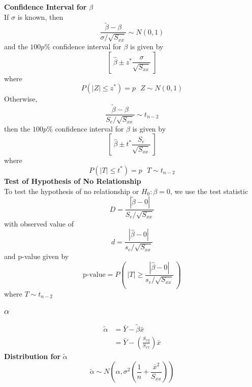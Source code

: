 \documentclass[12pt, leqno]{article}
\theoremstyle{definition}
\begin{document}
  \textbf{Confidence Interval for} $\beta$ \\
  If $\sigma$ is known, then
  $$\frac{\widetilde{\beta} - \beta}{\sigma / \sqrt{S_{xx}}} \sim N(0, 1)$$
  and the $100p\%$ confidence interval for $\beta$ is given by
  $$\left[~ \hat{\beta} \pm z^{*}\frac{\sigma}{\sqrt{S_{xx}}} ~\right]$$
  where
  $$P(|Z| \leq z^{*}) = p ~~~ Z \sim N(0, 1)$$
  \newline
  Otherwise,
  $$\frac{\widetilde{\beta} - \beta}{S_{e} / \sqrt{S_{xx}}} \sim t_{n-2}$$
  then the $100p\%$ confidence interval for $\beta$ is given by
  $$\left[~ \hat{\beta} \pm t^{*}\frac{S_{e}}{\sqrt{S_{xx}}} ~\right]$$
  where
  $$P(|T| \leq t^{*}) = p ~~~ T \sim t_{n-2}$$
  \newline
  \textbf{Test of Hypothesis of No Relationship} \\
  To test the hypothesis of no relationship or $H_{0}: \beta = 0$, we use the test statistic
  $$D = \frac{|\widetilde{\beta} - 0|}{S_{e} / \sqrt{S_{xx}}}$$
  with observed value of
  $$d = \frac{|\hat{\beta} - 0|}{s_{e} / \sqrt{S_{xx}}}$$
  and p-value given by
  $$\text{p-value} = P\left(~|T| \geq \frac{|\hat{\beta} - 0|}{s_{e} / \sqrt{S_{xx}}}~\right)$$
  where $T \sim t_{n-2}$

  \subsubsection{$\alpha$}
  \begin{align*}
  \widetilde{\alpha} &= \bar{Y} - \widetilde{\beta}\bar{x} \\
  &= \bar{Y} - \left(\frac{S_{xy}}{S_{xx}}\right)\bar{x}
  \end{align*}
  \textbf{Distribution for } $\widetilde{\alpha}$ \\
  $$\widetilde{\alpha} \sim N\left(\alpha, \sigma^{2}\left(\frac{1}{n} + \frac{\bar{x}^{2}}{S_{xx}}\right)\right)$$
\end{document}
